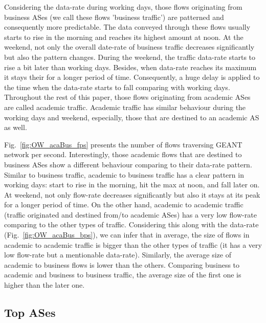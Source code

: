 \documentclass[10pt, journal, letterpaper]{IEEEtran}
\begin{document}
Considering the data-rate during working days, those flows originating from business ASes (we call these flows 'business traffic') are patterned and consequently more predictable. The data conveyed through these flows usually starts to rise in the morning and reaches its highest amount at noon. At the weekend, not only the overall date-rate of business traffic decreases significantly but also the pattern changes. During the weekend, the traffic data-rate starts to rise a bit later than working days. Besides, when data-rate reaches its maximum it stays their for a longer period of time. Consequently, a huge delay is applied to the time when the data-rate starts to fall comparing with working days.
Throughout the rest of this paper, those flows originating from academic ASes are called academic traffic. Academic traffic has similar behaviour during the working days and weekend, especially, those that are destined to an academic AS as well. 

Fig.~\ref{fig:OW_acaBus_fps} presents the number of flows traversing GEANT network per second. Interestingly, those academic flows that are destined to business ASes show a different behaviour comparing to their data-rate pattern. Similar to business traffic, academic to business traffic has a clear pattern in working days: start to rise in the morning, hit the max at noon, and fall later on. At weekend, not only flow-rate decreases significantly but also it stays at its peak for a longer period of time. On the other hand, academic to academic traffic (traffic originated and destined from/to academic ASes) has a very low flow-rate comparing to the other types of traffic. Considering this along with the data-rate (Fig.~\ref{fig:OW_acaBus_bps}), we can infer that in average, the size of flows in academic to academic traffic is bigger than the other types of traffic (it has a very low flow-rate but a mentionable data-rate). Similarly, the average size of academic to business flows is lower than the others. Comparing business to academic and business to business traffic, the average size of the first one is higher than the later one.

\subsection{Top ASes}
\end{document}
